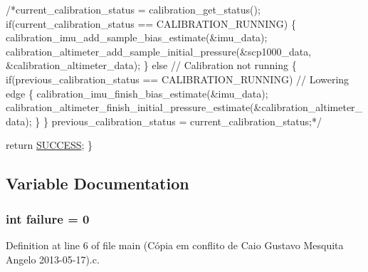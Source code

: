 \begin{DoxyCode}
    \textcolor{comment}{/*current\_calibration\_status = calibration\_get\_status();}
\textcolor{comment}{    if(current\_calibration\_status == CALIBRATION\_RUNNING)}
\textcolor{comment}{    \{}
\textcolor{comment}{        calibration\_imu\_add\_sample\_bias\_estimate(&imu\_data);}
\textcolor{comment}{        calibration\_altimeter\_add\_sample\_initial\_pressure(&scp1000\_data,
       &calibration\_altimeter\_data);}
\textcolor{comment}{    \}}
\textcolor{comment}{    else // Calibration not running}
\textcolor{comment}{    \{}
\textcolor{comment}{        if(previous\_calibration\_status == CALIBRATION\_RUNNING) // Lowering edge}
\textcolor{comment}{        \{}
\textcolor{comment}{            calibration\_imu\_finish\_bias\_estimate(&imu\_data);}
\textcolor{comment}{           
       calibration\_altimeter\_finish\_initial\_pressure\_estimate(&calibration\_altimeter\_data);}
\textcolor{comment}{        \}}
\textcolor{comment}{    \}}
\textcolor{comment}{    previous\_calibration\_status = current\_calibration\_status;*/}

    \textcolor{keywordflow}{return} \hyperlink{communication_01_07C_xC3_xB3pia_01em_01conflito_01de_01Caio_01Gustavo_01Mesquita_01Angelo_012013-04-28_08_8h_aa90cac659d18e8ef6294c7ae337f6b58}{SUCCESS};
\}
\end{DoxyCode}


\subsection{Variable Documentation}
\hypertarget{main_01_07C_xC3_xB3pia_01em_01conflito_01de_01Caio_01Gustavo_01Mesquita_01Angelo_012013-05-17_08_8c_a4f35e5ea2395561d0bd3b2f45612dc2c}{
\subsubsection[{failure}]{\setlength{\rightskip}{0pt plus 5cm}int failure = 0}}\label{main_01_07C_xC3_xB3pia_01em_01conflito_01de_01Caio_01Gustavo_01Mesquita_01Angelo_012013-05-17_08_8c_a4f35e5ea2395561d0bd3b2f45612dc2c}


Definition at line 6 of file main (\-Cópia em conflito de Caio Gustavo Mesquita Angelo 2013-\/05-\/17).\-c.

